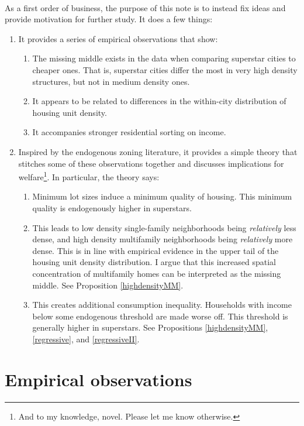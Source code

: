 \documentclass[]{article}
\theoremstyle{plain}
\begin{document}
\paragraph*{}
As a first order of business, the purpose of this note is to instead fix ideas and provide motivation for further study. It does a few things:
\begin{enumerate}
	\item It provides a series of empirical observations that show:
	\begin{enumerate}
		\item The missing middle exists in the data when comparing superstar cities to cheaper ones. That is, superstar cities differ the most in very high density structures, but not in medium density ones.
		\item It appears to be related to differences in the within-city distribution of housing unit density.
		\item It accompanies stronger residential sorting on income. 
		
	\end{enumerate}
\item Inspired by the endogenous zoning literature, it provides a simple theory that stitches some of these observations together and discusses implications for welfare\footnote{And to my knowledge, novel. Please let me know otherwise.}. In particular, the theory says:
	\begin{enumerate}
		\item Minimum lot sizes induce a minimum quality of housing. This minimum quality is endogenously higher in superstars.  
		\item This leads to low density single-family neighborhoods being \textit{relatively} less dense, and high density multifamily neighborhoods being \textit{relatively} more dense. This is in line with empirical evidence in the upper tail of the housing unit density distribution. I argue that this increased spatial concentration of multifamily homes can be interpreted as the missing middle. See Proposition \ref{highdensityMM}.
		\item This creates additional consumption inequality. Households with income below some endogenous threshold are made worse off. This threshold is generally higher in superstars. See Propositions \ref{highdensityMM}, \ref{regressive}, and \ref{regressiveII}. 
	\end{enumerate}
\end{enumerate}

\section{Empirical observations}
\end{document}
